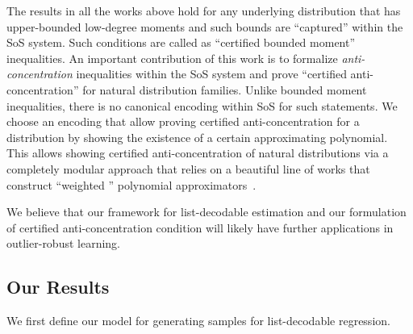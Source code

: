 The results in all the works above hold for any underlying distribution that has upper-bounded low-degree moments and such bounds are  ``captured'' within the SoS system. Such conditions are called as ``certified bounded moment'' inequalities. An important contribution of this work is to formalize \emph{anti-concentration} inequalities within the SoS system and prove ``certified anti-concentration'' for natural distribution families. Unlike bounded moment inequalities, there is no canonical encoding within SoS for such statements. We choose an encoding  that allow proving certified anti-concentration for a distribution by showing the existence of a certain approximating polynomial. This allows showing certified anti-concentration of natural distributions via a completely modular approach that relies on a beautiful line of works that construct ``weighted '' polynomial approximators~\cite{2007math......1099L}. 

We believe that our framework for list-decodable estimation and our formulation of certified anti-concentration condition will likely have further applications in outlier-robust learning. 
\subsection{Our Results}
We first define our model for generating samples for list-decodable regression.

